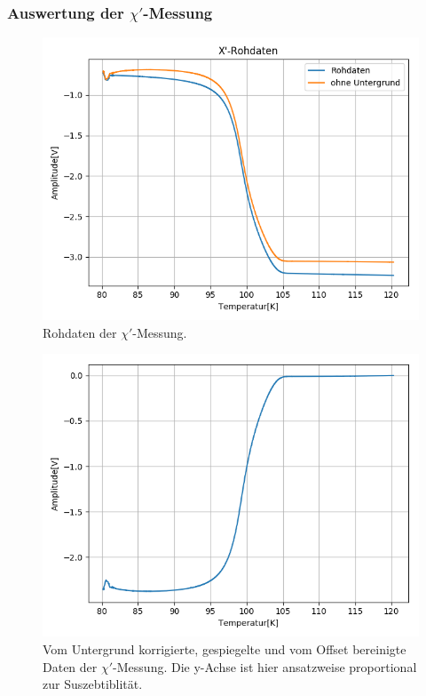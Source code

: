 \documentclass[12pt,a4paper]{article}
\begin{document}
\subsubsection{Auswertung der $\chi'$-Messung}
\begin{figure}
\centering
\includegraphics[scale=0.8]{Bilder/Haupt_Supra/X1roh.png}
\caption{Rohdaten der $\chi'$-Messung.}
\label{fig:Supra_X1roh}
\end{figure}

\begin{figure}
\centering
\includegraphics[scale=0.8]{Bilder/Haupt_Supra/X1_spiegel.png}
\caption{Vom Untergrund korrigierte, gespiegelte und vom Offset bereinigte Daten der $\chi'$-Messung. Die y-Achse ist hier ansatzweise proportional zur Suszebtiblität.}
\label{fig:Supra_X1spiegel}
\end{figure}
\end{document}
